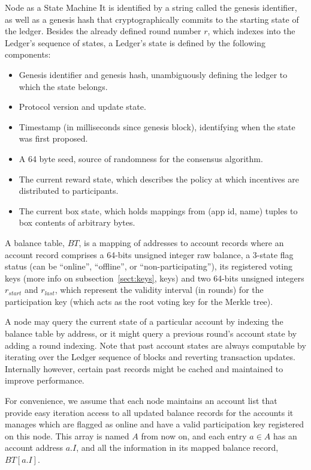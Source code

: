 \documentclass[10pt,a4paper]{article}
\begin{document}
\begin{section}{Node as a State Machine}
It is identified by a string called the genesis identifier, as well as a genesis hash that cryptographically 
commits to the starting state of the ledger.
Besides the already defined round number $r$, which indexes into the Ledger's sequence of states,
a Ledger's state is defined by the following components:
\begin{itemize}
    \item Genesis identifier and genesis hash, unambiguously defining the ledger 
    to which the state belongs.
    \item Protocol version and update state.
    \item Timestamp (in milliseconds since genesis block), identifying when the state was first proposed.
    \item A 64 byte seed, source of randomness for the consensus algorithm.
    \item The current reward state, which describes the policy at which incentives
    are distributed to participants.
    \item The current box state, which holds mappings from (app id, name) tuples
    to box contents of arbitrary bytes.
\end{itemize}

A {\sf balance table}, $BT$, is a mapping of addresses to 
account records where an {\sf account record} comprises 
a 64-bits unsigned integer raw balance, 
a 3-state flag status (can be ``online'', ``offline'', or ``non-participating''),
its registered voting keys (more info on subsection~\ref{sect:keys}, keys) and 
two 64-bits unsigned integers $r_{start}$ and $r_{last}$, which represent the 
validity interval (in rounds)
for the participation key (which acts as the root voting key for the Merkle tree).

A node may query the current state of a particular account by indexing the balance 
table by address, or it might query a previous round's account state by adding a 
round indexing. 
Note that past account states are always computable by iterating over the Ledger
sequence of blocks and reverting transaction updates. Internally however, certain
past records might be cached and maintained to improve performance.

For convenience, we assume that each node maintains an account list that provide 
easy iteration access to all updated balance records for the accounts it manages 
which are flagged as online and have a valid participation key registered on this
node. 
This array is named $A$ from now on, and each entry $a\in A$ has an account address 
$a.I$, and all the information in its mapped balance record, $BT[a.I]$.


\end{section}
\end{document}
